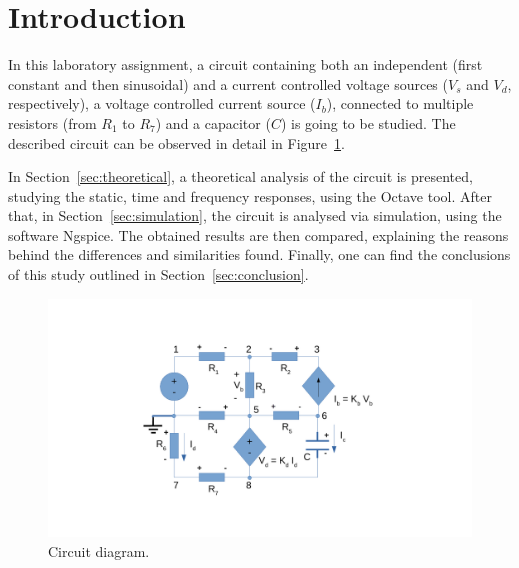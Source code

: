 \newpage
\section{Introduction}
\label{sec:introduction}

\par In this laboratory assignment, a circuit containing both an independent (first constant and then sinusoidal) and a current controlled voltage sources ($V_s$ and $V_d$, respectively), a voltage controlled current source ($I_b$), connected to multiple resistors (from $R_{1}$ to $R_{7}$) and a capacitor ($C$) is going to be studied. The described circuit can be observed in detail in Figure~\ref{fig:rc}.

\par In Section~\ref{sec:theoretical}, a theoretical analysis of the circuit is presented, studying the static, time and frequency responses, using the Octave tool. After that, in Section~\ref{sec:simulation}, the circuit is analysed via simulation, using the software Ngspice. The obtained results are then compared, explaining the reasons behind the differences and similarities found. Finally, one can find the conclusions of this study outlined in Section~\ref{sec:conclusion}.

\begin{figure}[h] \centering
\includegraphics[width=1.1\linewidth]{rc.pdf}
\caption{Circuit diagram.}
\label{fig:rc}
\end{figure}
